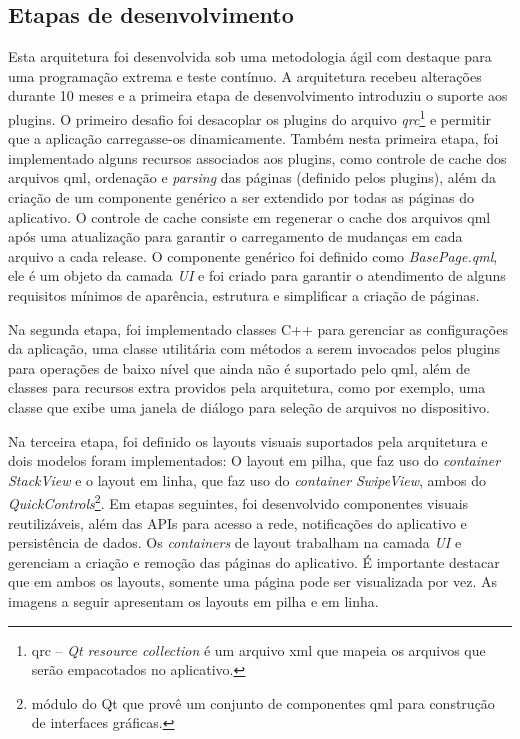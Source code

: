 \subsection{Etapas de desenvolvimento}
Esta arquitetura foi desenvolvida sob uma metodologia ágil com destaque para uma programação extrema e teste contínuo. A arquitetura recebeu alterações durante 10 meses e a primeira etapa de desenvolvimento introduziu o suporte aos plugins. O primeiro desafio foi desacoplar os plugins do arquivo \textit{qrc}\footnote{qrc – \textit{Qt resource collection} é um arquivo xml que mapeia os arquivos que serão empacotados no aplicativo.} e permitir que a aplicação carregasse-os dinamicamente. Também nesta primeira etapa, foi implementado alguns recursos associados aos plugins, como controle de cache dos arquivos qml, ordenação e \textit{parsing} das páginas (definido pelos plugins), além da criação de um componente genérico a ser extendido por todas as páginas do aplicativo. O controle de cache consiste em regenerar o cache dos arquivos qml após uma atualização para garantir o carregamento de mudanças em cada arquivo a cada release. O componente genérico foi definido como \textit{BasePage.qml}, ele é um objeto da camada \textit{UI} e foi criado para garantir o atendimento de alguns requisitos mínimos de aparência, estrutura e simplificar a criação de páginas.\par

Na segunda etapa, foi implementado classes C++ para gerenciar as configurações da aplicação, uma classe utilitária com métodos a serem invocados pelos plugins para operações de baixo nível que ainda não é suportado pelo qml, além de classes para recursos extra providos pela arquitetura, como por exemplo, uma classe que exibe uma janela de diálogo para seleção de arquivos no dispositivo.\par

Na terceira etapa, foi definido os layouts visuais suportados pela arquitetura e dois modelos foram implementados: O layout em pilha, que faz uso do \textit{container} \textit{StackView} e o layout em linha, que faz uso do \textit{container} \textit{SwipeView}, ambos do \textit{QuickControls}\footnote{módulo do Qt que provê um conjunto de componentes qml para construção de interfaces gráficas.}. Em etapas seguintes, foi desenvolvido componentes visuais reutilizáveis, além das APIs para acesso a rede, notificações do aplicativo e persistência de dados. Os \textit{containers} de layout trabalham na camada \textit{UI} e gerenciam a criação e remoção das páginas do aplicativo. É importante destacar que em ambos os layouts, somente uma página pode ser visualizada por vez. As imagens a seguir apresentam os layouts em pilha e em linha.

